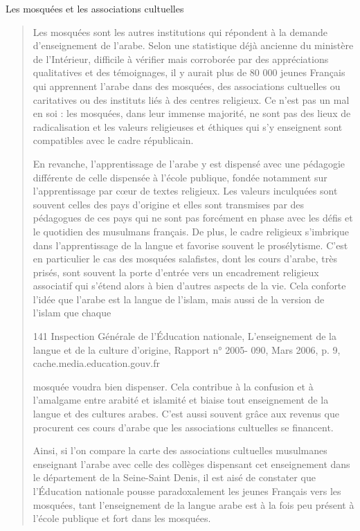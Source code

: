 Les mosquées et les associations cultuelles

\begin{quote}
Les mosquées sont les autres institutions qui répondent à la demande
d'enseignement de l'arabe. Selon une statistique déjà ancienne du
ministère de l'Intérieur, difficile à vérifier mais corroborée par des
appréciations qualitatives et des témoignages, il y aurait plus de 80
000 jeunes Français qui apprennent l'arabe dans des mosquées, des
associations cultuelles ou caritatives ou des instituts liés à des
centres religieux. Ce n'est pas un mal en soi : les mosquées, dans leur
immense majorité, ne sont pas des lieux de radicalisation et les valeurs
religieuses et éthiques qui s'y enseignent sont compatibles avec le
cadre républicain.

En revanche, l'apprentissage de l'arabe y est dispensé avec une
pédagogie différente de celle dispensée à l'école publique, fondée
notamment sur l'apprentissage par cœur de textes religieux. Les valeurs
inculquées sont souvent celles des pays d'origine et elles sont
transmises par des pédagogues de ces pays qui ne sont pas forcément en
phase avec les défis et le quotidien des musulmans français. De plus, le
cadre religieux s'imbrique dans l'apprentissage de la langue et favorise
souvent le prosélytisme. C'est en particulier le cas des mosquées
salafistes, dont les cours d'arabe, très prisés, sont souvent la porte
d'entrée vers un encadrement religieux associatif qui s'étend alors à
bien d'autres aspects de la vie. Cela conforte l'idée que l'arabe est la
langue de l'islam, mais aussi de la version de l'islam que chaque

141 Inspection Générale de l'Éducation nationale, L'enseignement de la
langue et de la culture d'origine, Rapport n° 2005- 090, Mars 2006, p.
9, cache.media.education.gouv.fr



mosquée voudra bien dispenser. Cela contribue à la confusion et à
l'amalgame entre arabité et islamité et biaise tout enseignement de la
langue et des cultures arabes. C'est aussi souvent grâce aux revenus que
procurent ces cours d'arabe que les associations cultuelles se
financent.

Ainsi, si l'on compare la carte des associations cultuelles musulmanes
enseignant l'arabe avec celle des collèges dispensant cet enseignement
dans le département de la Seine-Saint Denis, il est aisé de constater
que l'Éducation nationale pousse paradoxalement les jeunes Français vers
les mosquées, tant l'enseignement de la langue arabe est à la fois peu
présent à l'école publique et fort dans les mosquées.
\end{quote}

